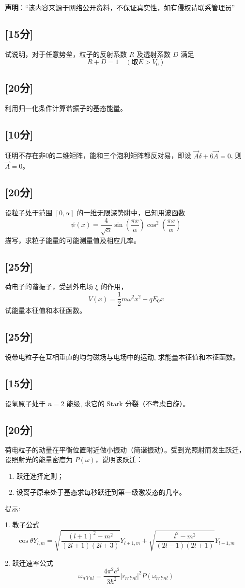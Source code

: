 
\textbf{声明}：“该内容来源于网络公开资料，不保证真实性，如有侵权请联系管理员”

\subsection{[15分]}
试说明，对于任意势垒，粒子的反射系数 $R$ 及透射系数 $D$ 满足
\[    R + D = 1 \quad (\text{取} E > V_0) ~ \]
\subsection{[20分]}
利用归一化条件计算谐振子的基态能量。
\subsection{[10分]}
证明不存在非0的二维矩阵，能和三个泡利矩阵都反对易，即设 $\vec A \delta + 6\vec A = 0$, 则 $\vec{A} = 0$。
\subsection{[20分]}
设粒子处于范围 $[0, \alpha]$ 的一维无限深势阱中，已知用波函数
    \[    \psi(x) = \frac{4}{\sqrt{\alpha}} \sin\left(\frac{\pi x}{\alpha}\right) \cos^2\left(\frac{\pi x}{\alpha}\right) ~ \]
    描写，求粒子能量的可能测量值及相应几率。
\subsection{[25分]}
荷电子的谐振子，受到外电场 $\xi$ 的作用，
    \[    V(x) = \frac{1}{2} m \omega^2 x^2 - q E_0 x  ~\]
 试能量本征值和本征函数。
\subsection{[25分]}
设带电粒子在互相垂直的均匀磁场与电场中的运动, 求能量本征值和本征函数。
\subsection{[15分]}
设氢原子处于 $n=2$ 能级, 求它的 Stark 分裂（不考虑自旋）。
\subsection{[20分]}
荷电粒子的动量在平衡位置附近做小振动（简谐振动）。受到光照射而发生跃迁，设照射光的能量密度为 $P(\omega)$，说明该跃迁：
    \begin{enumerate}
        \item 跃迁选择定则；
        \item 设离子原来处于基态求每秒跃迁到第一级激发态的几率。
    \end{enumerate}

提示:

1. 教子公式 $$\cos\theta Y_{l,m} = \sqrt{\frac{(l+1)^2 - m^2}{(2l+1)(2l+3)}} Y_{l+1,m} + \sqrt{\frac{l^2 - m^2}{(2l-1)(2l+1)}} Y_{l-1,m}~$$

2. 跃迁速率公式 $$\omega_{n'l'nl} = \frac{4 \pi^2 e^2}{3 \hbar^2} \left| r_{n'l'nl} \right|^2 P(\omega_{n'l'nl})~$$